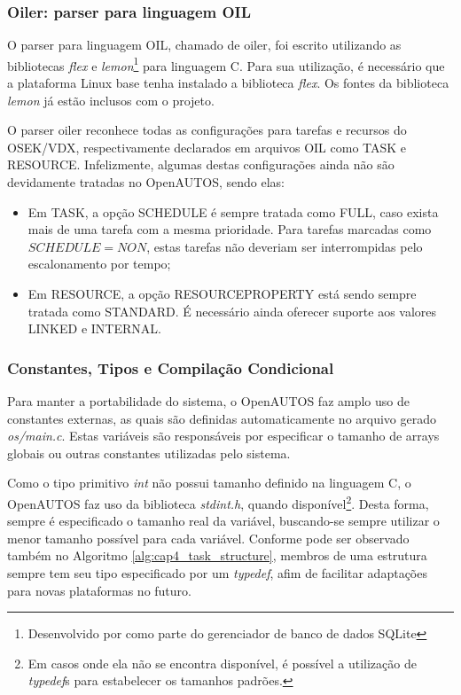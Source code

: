 \documentclass[conference,compsoc]{IEEEtran}
\newcommand{\refalg}[1]{Algoritmo \ref{alg:#1}}
\begin{document}
\subsubsection{Oiler: parser para linguagem OIL} \label{cap:cap4_oiler}

O parser para linguagem OIL, chamado de oiler, foi escrito utilizando as bibliotecas \emph{flex} e \emph{lemon}\footnote{Desenvolvido por  como parte do gerenciador de banco de dados SQLite} para linguagem C. Para sua utilização, é necessário que a plataforma Linux base tenha instalado a biblioteca \emph{flex}. Os fontes da biblioteca \emph{lemon} já estão inclusos com o projeto.

O parser oiler reconhece todas as configurações para tarefas e recursos do OSEK/VDX, respectivamente declarados em arquivos OIL como TASK e RESOURCE. Infelizmente, algumas destas configurações ainda não são devidamente tratadas no OpenAUTOS, sendo elas:

\begin{itemize}
	\item Em TASK, a opção SCHEDULE é sempre tratada como FULL, caso exista mais de uma tarefa com a mesma prioridade. Para tarefas marcadas como $SCHEDULE = NON$, estas tarefas não deveriam ser interrompidas pelo escalonamento por tempo;
	\item Em RESOURCE, a opção RESOURCEPROPERTY está sendo sempre tratada como STANDARD. É necessário ainda oferecer suporte aos valores LINKED e INTERNAL.
\end{itemize}

\subsubsection{Constantes, Tipos e Compilação Condicional}

Para manter a portabilidade do sistema, o OpenAUTOS faz amplo uso de constantes externas, as quais são definidas automaticamente no arquivo gerado \emph{os/main.c}. Estas variáveis são responsáveis por especificar o tamanho de arrays globais ou outras constantes utilizadas pelo sistema.

Como o tipo primitivo \emph{int} não possui tamanho definido na linguagem C, o OpenAUTOS faz uso da biblioteca \emph{stdint.h}, quando disponível\footnote{Em casos onde ela não se encontra disponível, é possível a utilização de \emph{typedef}s para estabelecer os tamanhos padrões.}. Desta forma, sempre é especificado o tamanho real da variável, buscando-se sempre utilizar o menor tamanho possível para cada variável. Conforme pode ser observado também no \refalg{cap4_task_structure}, membros de uma estrutura sempre tem seu tipo especificado por um \emph{typedef}, afim de facilitar adaptações para novas plataformas no futuro.
\end{document}
